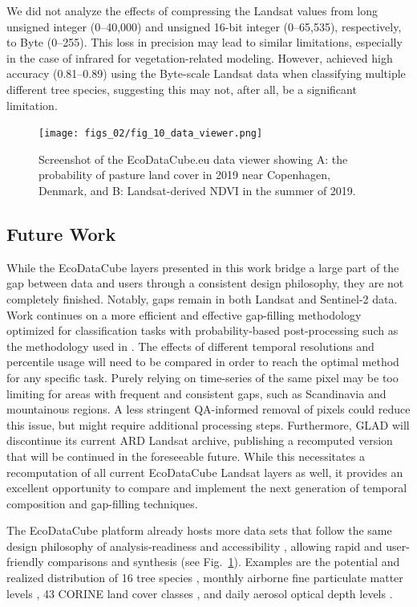 We did not analyze the effects of compressing the Landsat values from long unsigned integer (0--40,000) and unsigned 16-bit integer (0--65,535), respectively, to Byte (0--255). This loss in precision may lead to similar limitations, especially in the case of infrared for vegetation-related modeling. However, \citet{bonannella2022forest} achieved high accuracy (0.81--0.89) using the Byte-scale Landsat data when classifying multiple different tree species, suggesting this may not, after all, be a significant limitation.

\begin{figure}[p]
\texttt{[image: figs\_02/fig\_10\_data\_viewer.png]}
\caption{Screenshot of the EcoDataCube.eu data viewer showing A: the probability of pasture land cover in 2019 near Copenhagen, Denmark, and B: Landsat-derived NDVI in the summer of 2019.}
\label{fig:10_dataviewer_pasture}
\end{figure}

\subsection*{Future Work}
    
While the EcoDataCube layers presented in this work bridge a large part of the gap between data and users through a consistent design philosophy, they are not completely finished. Notably, gaps remain in both Landsat and Sentinel-2 data. Work continues on a more efficient and effective gap-filling methodology optimized for classification tasks with probability-based post-processing such as the methodology used in \citet{witjes2022spatiotemporal}. The effects of different temporal resolutions and percentile usage will need to be compared in order to reach the optimal method for any specific task. Purely relying on time-series of the same pixel may be too limiting for areas with frequent and consistent gaps, such as Scandinavia and mountainous regions. A less stringent QA-informed removal of pixels could reduce this issue, but might require additional processing steps. Furthermore, GLAD will discontinue its current ARD Landsat archive, publishing a recomputed version that will be continued in the foreseeable future. While this necessitates a recomputation of all current EcoDataCube Landsat layers as well, it provides an excellent opportunity to compare and implement the next generation of temporal composition and gap-filling techniques.
        
The EcoDataCube platform already hosts more data sets that follow the same design philosophy of analysis-readiness and accessibility \citep{wagemann2021a}, allowing rapid and user-friendly comparisons and synthesis (see Fig.\@~\ref{fig:10_dataviewer_pasture}). Examples are the potential and realized distribution of 16 tree species \citep{bonannella2022forest}, monthly airborne fine particulate matter levels \citep{ibrahim2022machine}, 43 CORINE land cover classes \citep{witjes2022spatiotemporal}, and daily aerosol optical depth levels \citep{ibrahim2021space}. 

